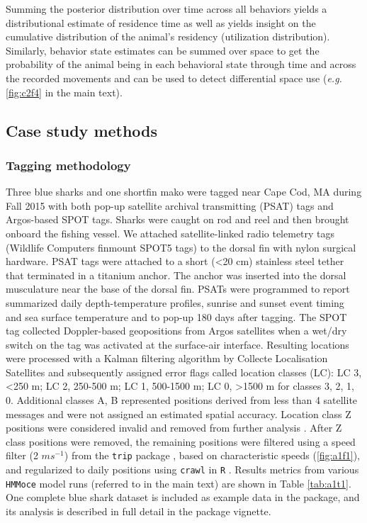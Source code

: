 Summing the posterior distribution over time across all behaviors yields a distributional estimate of residence time \citep{Pedersen2011a} as well as yields insight on the cumulative distribution of the animal's residency (utilization distribution). Similarly, behavior state estimates can be summed over space to get the probability of the animal being in each behavioral state through time and across the recorded movements and can be used to detect differential space use (\emph{e.g.} \cref{fig:c2f4} in the main text).

\subsection{Case study methods}%

\subsubsection{Tagging methodology}%

Three blue sharks and one shortfin mako were tagged near Cape Cod, MA during Fall 2015 with both pop-up satellite archival transmitting (PSAT) tags and Argos-based SPOT tags. Sharks were caught on rod and reel and then brought onboard the fishing vessel. We attached satellite-linked radio telemetry tags (Wildlife Computers finmount SPOT5 tags) to the dorsal fin with nylon surgical hardware. PSAT tags were attached to a short (\textless{}20 cm) stainless steel tether that terminated in a titanium anchor. The anchor was inserted into the dorsal musculature near the base of the dorsal fin. PSATs were programmed to report summarized daily depth-temperature profiles, sunrise and sunset event timing and sea surface temperature and to pop-up 180 days after tagging. The SPOT tag collected Doppler-based geopositions from Argos satellites when a wet/dry switch on the tag was activated at the surface-air interface. Resulting locations were processed with a Kalman filtering algorithm by Collecte Localisation Satellites \citep{Lopez2014} and subsequently assigned error flags called location classes (LC): LC 3, \textless{}250 m; LC 2, 250-500 m; LC 1, 500-1500 m; LC 0, \textgreater{}1500 m for classes 3, 2, 1, 0. Additional classes A, B represented positions derived from less than 4 satellite messages and were not assigned an estimated spatial accuracy. Location class Z positions were considered invalid and removed from further analysis \citep{CLS2016}. After Z class positions were removed, the remaining positions were filtered using a speed filter (2 $m s^{-1}$) from the \texttt{trip} package \citep{Sumner2015}, based on characteristic speeds (\cref{fig:a1f1}), and regularized to daily positions using \texttt{crawl} \citep{Johnson2008a} in \texttt{R} \citep{RDevelopmentCoreTeam2015}. Results metrics from various \texttt{HMMoce} model runs (referred to in the main text) are shown in Table \ref{tab:a1t1}. One complete blue shark dataset is included as example data in the package, and its analysis is described in full detail in the package vignette.

